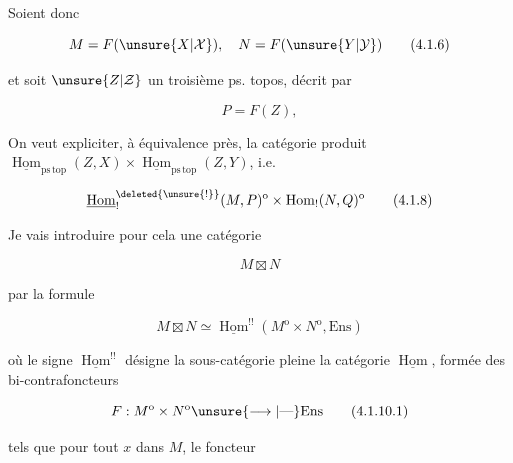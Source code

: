 Soient donc 

\[
M=F(\unsure{X|\mathcal X}),\quad N=F(\unsure{Y|\mathcal Y})
\tag*{(4.1.6)}
\]

et soit $\unsure{Z|\mathcal Z}$ un troisième ps. topos, décrit par

\[
P=F(Z),
\tag*{(4.1.7)}
\]

On veut expliciter, à équivalence près, la catégorie produit $\underline{\operatorname{Hom}}_{\mathrm{ps\,top}}(Z,X)\times\underline{\operatorname{Hom}}_{\mathrm{ps\,top}}(Z,Y)$, i.e.

\[
\underline{\operatorname{Hom}}_{!}^{\deleted{\unsure{!}}}(M,P)^{\mathrm{o}}
\times\operatorname{Hom}_{!}(N,Q)^{\mathrm{o}}
\tag*{(4.1.8)}
\]




\deleted{\[
(f^{*}\boxtimes g^{*})(x,y)=
\underbrace{\unsure{g^{*}|f^{*}}(\unsure{a|x})\times f^{\unsure{*|\alpha}}(y)}_{\substack{\text{produit cartésien}\\\text{dans }P}}
\tag*{(4.1.10)}
\]}

Je vais introduire pour cela une catégorie

\[
M\boxtimes N
\tag*{(4.1.9)}
\]

par la formule

\deleted{\[
\begin{aligned}
M\boxtimes N &\unsure{\simeq|=} \text{sous-catégorie pleine de}\\
&\underline{\operatorname{Hom}}^{!}(M^{\mathrm{o}},N)
\end{aligned}
\tag*{(\unsure{4.1.10})}
\]}

\[
M\boxtimes N\simeq\underline{\operatorname{Hom}}^{!!}(M^{\mathrm{o}}\times N^{\mathrm{o}},\mathrm{Ens})
\tag*{(4.1.10)}
\]

où le signe $\underline{\operatorname{Hom}}^{!!}$ désigne la sous-catégorie pleine  la catégorie $\underline{\operatorname{Hom}}$, formée des bi-contrafoncteurs 

\[
F:M^{\mathrm{o}}\times N^{\mathrm{o}}\unsure{\longrightarrow|\text{---}}\mathrm{Ens}
\tag*{(4.1.10.1)}
\]

tels que pour tout $x$ dans $M$, le foncteur

